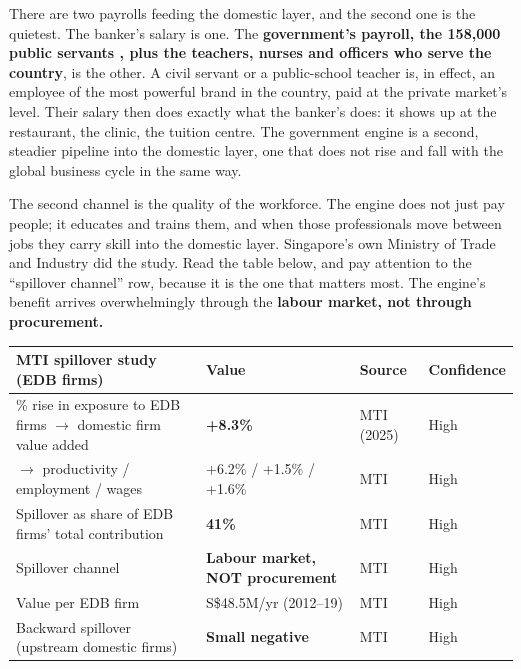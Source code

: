 \documentclass[10pt,twoside,openany]{memoir}
\renewcommand{\arraystretch}{1.1}
\begin{document}
{{{{{There are two payrolls feeding the domestic layer, and the second one is
the quietest. The banker's salary is one. The \textbf{government's
payroll, the 158,000 public servants
\cite{singstat-governmentemployment}, plus the teachers, nurses and
officers who serve the country}, is the other. A civil servant or a
public-school teacher is, in effect, an employee of the most powerful
brand in the country, paid at the private market's level. Their salary
then does exactly what the banker's does: it shows up at the restaurant,
the clinic, the tuition centre. The government engine is a second,
steadier pipeline into the domestic layer, one that does not rise and
fall with the global business cycle in the same way.

The second channel is the quality of the workforce. The engine does not
just pay people; it educates and trains them, and when those
professionals move between jobs they carry skill into the domestic
layer. Singapore's own Ministry of Trade and Industry did the study.
Read the table below, and pay attention to the ``spillover channel''
row, because it is the one that matters most. The engine's benefit
arrives overwhelmingly through the \textbf{labour market, not through
procurement.}

{\def\LTcaptype{none} %
{\renewcommand{\arraystretch}{0.9}\begin{longtable}[]{@{}
  >{\raggedright\arraybackslash}p{}
  >{\raggedright\arraybackslash}p{}
  >{\raggedright\arraybackslash}p{}
  >{\raggedright\arraybackslash}p{}@{}}
\toprule\noalign{}
\begin{minipage}[b]{\linewidth}\raggedright
MTI spillover study (EDB firms)
\end{minipage} & \begin{minipage}[b]{\linewidth}\raggedright
Value
\end{minipage} & \begin{minipage}[b]{\linewidth}\raggedright
Source
\end{minipage} & \begin{minipage}[b]{\linewidth}\raggedright
Confidence
\end{minipage} \\
\midrule\noalign{}
\endhead
\bottomrule\noalign{}
\endlastfoot
10\% rise in exposure to EDB firms \(\rightarrow\) domestic firm value
added & \textbf{+8.3\%} & MTI (2025) & High \\
\(\rightarrow\) productivity / employment / wages & +6.2\% / +1.5\% /
+1.6\% & MTI & High \\
Spillover as share of EDB firms' total contribution & \textbf{41\%} &
MTI & High \\
Spillover channel & \textbf{Labour market, NOT procurement} & MTI &
High \\
Value per EDB firm & S\$48.5M/yr (2012--19) & MTI & High \\
Backward spillover (upstream domestic firms) & \textbf{Small negative} &
MTI & High \\
\end{longtable}
}

}}}}}}
\end{document}
